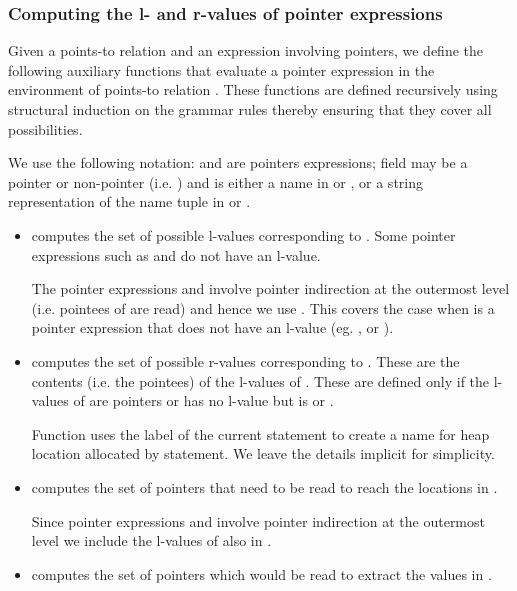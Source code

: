 \documentclass[a4paper,11pt,fleqn]{article}
\newcommand{\var}{\text{\sf\em V\/}\xspace}
\begin{document}
\subsubsection*{Computing the l- and r-values of pointer expressions}

Given a points-to relation \text{} and an
expression  involving pointers, we define the following
auxiliary functions that evaluate a pointer expression  in the
environment of points-to relation .
These functions are defined recursively using structural induction on the grammar 
rules thereby ensuring that they cover all possibilities.

We use the following notation:  and  are pointers expressions;
field  may be a pointer or non-pointer (i.e.
\text{})
and  is either a name in \var or \heap, or a string representation of the name tuple in \structp or \structm.

\begin{itemize}
\item {} computes the set of possible l-values         
      corresponding to . 
Some pointer expressions such as     
      and  do not have an l-value. 

The pointer expressions \text{} and 
\text{} involve pointer indirection at the outermost level (i.e. pointees of
 are read) and hence we use . This 
covers the case when  is a pointer expression that does not have an l-value (eg.
\text{}, or \text{}).

\item {} computes the set of possible r-values
      corresponding to . These are the contents (i.e. the pointees) of the l-values
      of . These are defined only if the l-values of  are pointers
      or  has no l-value but is  or .

Function \text{} uses the label of the current statement to create a name 
for heap location allocated by statement. 
We leave the details implicit for simplicity.

\item \text{} computes the set of pointers that need
       to be read to reach the locations in .

Since pointer expressions \text{} and 
\text{} involve pointer indirection at the outermost level we
include the l-values of  also in \derefp.

\item \text{} computes the set of pointers which would
       be read to extract the values in .

\end{itemize}
\end{document}

